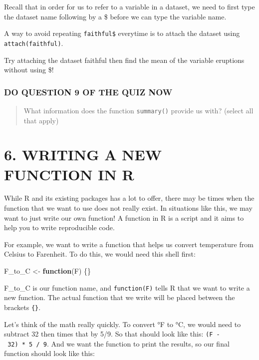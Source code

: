 \documentclass[
]{book}
\newenvironment{Shaded}{\begin{snugshade}}{\end{snugshade}}
\newcommand{\ControlFlowTok}[1]{\textcolor[rgb]{0.13,0.29,0.53}{\textbf{#1}}}
\newcommand{\NormalTok}[1]{#1}
\newcommand{\OtherTok}[1]{\textcolor[rgb]{0.56,0.35,0.01}{#1}}
\begin{document}
Recall that in order for us to refer to a variable in a dataset, we need to first type the dataset name following by a \$ before we can type the variable name.

A way to avoid repeating \texttt{faithful\$} everytime is to attach the dataset using \texttt{attach(faithful)}.

Try attaching the dataset faithful then find the mean of the variable eruptions without using \$!

\hypertarget{do-question-9-of-the-quiz-now}{%
\subsubsection{DO QUESTION 9 OF THE QUIZ NOW}\label{do-question-9-of-the-quiz-now}}

\begin{quote}
What information does the function \texttt{summary()} provide us with? (select all that apply)
\end{quote}

\hypertarget{writing-a-new-function-in-r}{%
\section{6. WRITING A NEW FUNCTION IN R}\label{writing-a-new-function-in-r}}

While R and its existing packages has a lot to offer, there may be times when the function that we want to use does not really exist. In situations like this, we may want to just write our own function! A function in R is a script and it aims to help you to write reproducible code.

For example, we want to write a function that helps us convert temperature from Celsius to Farenheit. To do this, we would need this shell first:

\begin{Shaded}
\begin{Highlighting}[]
\NormalTok{F\_to\_C }\OtherTok{\textless{}{-}} \ControlFlowTok{function}\NormalTok{(F) \{\}}
\end{Highlighting}
\end{Shaded}

F\_to\_C is our function name, and \texttt{function(F)} tells R that we want to write a new function. The actual function that we write will be placed between the brackets \texttt{\{\}}.

Let's think of the math really quickly. To convert °F to °C, we would need to subtract 32 then times that by 5/9. So that should look like this: \texttt{(F\ -\ 32)\ *\ 5\ /\ 9}. And we want the function to print the results, so our final function should look like this:
\end{document}
